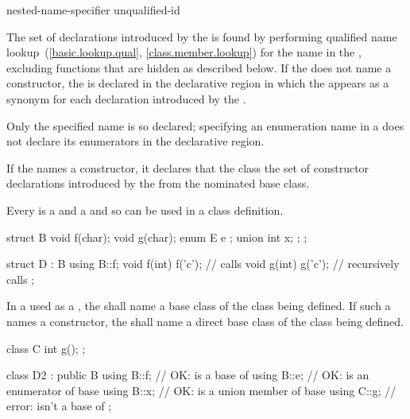 \begin{bnf}
\br
     nested-name-specifier unqualified-id \terminal{;}\br
\end{bnf}

The set of declarations introduced by the  is found by
performing qualified name lookup~(\ref{basic.lookup.qual}, \ref{class.member.lookup})
for the name in the ,
excluding functions that are hidden as described below.
If the  does not name a constructor,
the  is declared in the declarative region
in which the  appears
as a synonym for each declaration introduced by the .
\begin{note} Only the specified name is so declared;
specifying an enumeration name in a 
does not declare its enumerators
in the  declarative region.
\end{note}
%
If the  names a constructor,
it declares that the class  the set of constructor declarations
introduced by the  from the nominated base class.

\pnum
Every  is a  and a
 and so can be used in a class definition.
\begin{example}

\begin{codeblock}
struct B {
  void f(char);
  void g(char);
  enum E { e };
  union { int x; };
};

struct D : B {
  using B::f;
  void f(int) { f('c'); }       // calls 
  void g(int) { g('c'); }       // recursively calls 
};
\end{codeblock}
\end{example}

\pnum
In a  used as a
, the 
shall name a base class of the class being defined. If such a
 names a constructor, the
 shall name a direct base class of the class
being defined.
\begin{example}

\begin{codeblock}
class C {
  int g();
};

class D2 : public B {
  using B::f;                   // OK:  is a base of 
  using B::e;                   // OK:  is an enumerator of base 
  using B::x;                   // OK:  is a union member of base 
  using C::g;                   // error:  isn't a base of 
};
\end{codeblock}
\end{example}


